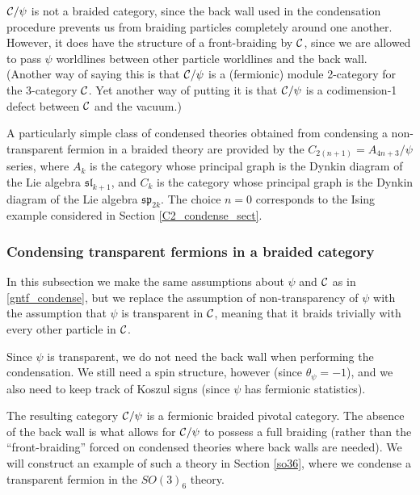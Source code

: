 \medskip

$\mathcal{C}/\psi$ is not a braided category, since the back wall used in the condensation procedure 
prevents us from braiding particles completely around one another. 
However, it does have the structure of a front-braiding by $\mathcal{C}$, since we are allowed to 
pass $\psi$ worldlines between other particle worldlines and the back wall. 
(Another way of saying this is that $\mathcal{C}/\psi$ is a (fermionic) module 2-category for the 3-category $\mathcal{C}$.
Yet another way of putting it is that $\mathcal{C}/\psi$ is a codimension-1 defect between $\mathcal{C}$ and the vacuum.)

\medskip


A particularly simple class of condensed theories obtained from condensing a non-
transparent fermion in a braided theory are provided by the $C_{2(n+1)} = A_{4n+3} / \psi$ series, 
where $A_k$ is the category whose principal graph is the Dynkin diagram of the Lie algebra $\mathfrak{sl}_{k+1}$, 
and $C_k$ is the category whose principal graph is the Dynkin 
diagram of the Lie algebra $\mathfrak{sp}_{2k}$.
The choice $n=0$ 
corresponds to the Ising example considered in Section \ref{C2_condense_sect}. 


\subsubsection{Condensing transparent fermions in a braided category}
\label{condense_transparent_fermion}

In this subsection we make the same assumptions about $\psi$ and $\mathcal{C}$ as in \ref{gntf_condense}, 
but we replace the assumption of non-transparency of $\psi$ with the 
assumption that $\psi$ is transparent in $\mathcal{C}$, meaning that it braids trivially with every other particle in $\mathcal{C}$.

Since $\psi$ is transparent, we do not need the back wall when performing the condensation.
We still need a spin structure, however (since $\theta_\psi = -1$), and we also need to keep track of 
Koszul signs (since $\psi$ has fermionic statistics).

The resulting category $\mathcal{C}/\psi$ is a fermionic braided pivotal category.
The absence of the back wall is what allows for $\mathcal{C} / \psi$ to possess a full braiding (rather than the 
``front-braiding'' forced on condensed theories where back walls are needed). 
We will construct an example of such a theory in Section \ref{so36}, where we condense a transparent fermion 
in the $SO(3)_6$ theory.

